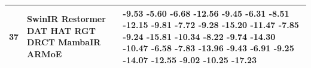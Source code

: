 \begin{tabular}{lll}
\toprule
37 & SwinIR Restormer DAT HAT RGT DRCT MambaIR ARMoE & -9.53 -5.60 -6.68 -12.56 -9.45 -6.31 -8.51 -12.15 -9.81 -7.72 -9.28 -15.20 -11.47 -7.85 -9.24 -15.81 -10.34 -8.22 -9.74 -14.30 -10.47 -6.58 -7.83 -13.96 -9.43 -6.91 -9.25 -14.07 -12.55 -9.02 -10.25 -17.23 \\
\midrule
\bottomrule
\end{tabular}
